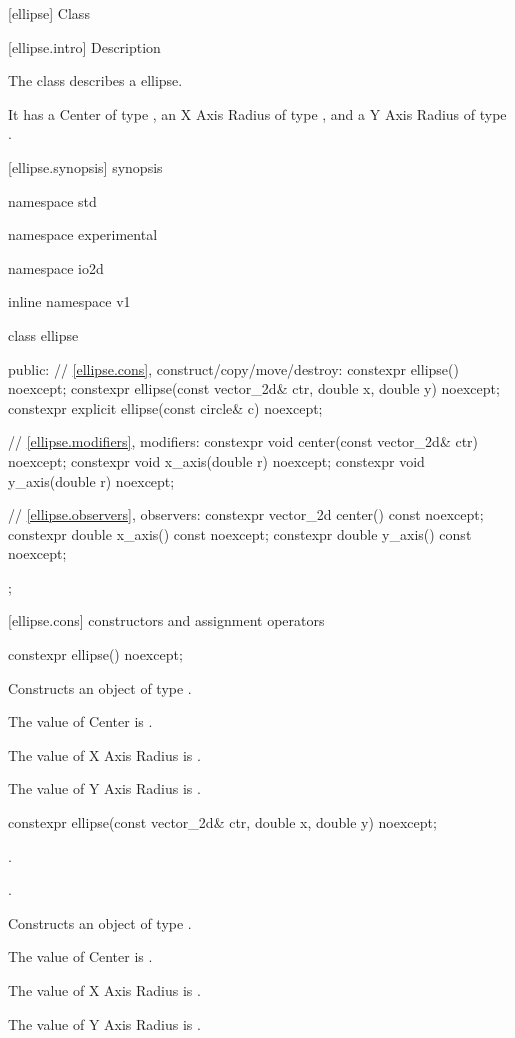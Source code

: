  [ellipse] {Class }

 [ellipse.intro] { Description}

\pnum
{}
The class  describes a ellipse.

\pnum
It has a Center of type , an X Axis Radius of type , and a Y Axis Radius of type .

 [ellipse.synopsis] { synopsis}

\begin{codeblock}
namespace std { namespace experimental { namespace io2d { inline namespace v1 {
  class ellipse {
  public:
    // \ref{ellipse.cons}, construct/copy/move/destroy:
    constexpr ellipse() noexcept;
    constexpr ellipse(const vector_2d& ctr, double x, double y) noexcept;
    constexpr explicit ellipse(const circle& c) noexcept;

    // \ref{ellipse.modifiers}, modifiers:
    constexpr void center(const vector_2d& ctr) noexcept;
    constexpr void x_axis(double r) noexcept;
    constexpr void y_axis(double r) noexcept;
    
    // \ref{ellipse.observers}, observers:
    constexpr vector_2d center() const noexcept;
    constexpr double x_axis() const noexcept;
    constexpr double y_axis() const noexcept;
  };
} } } }
\end{codeblock}

 [ellipse.cons] { constructors and assignment operators}

\begin{itemdecl}
constexpr ellipse() noexcept;
\end{itemdecl}
\begin{itemdescr}
\pnum
\effects
Constructs an object of type .

\pnum
The value of Center is .

\pnum
The value of X Axis Radius is .

\pnum
The value of Y Axis Radius is .
\end{itemdescr}

\begin{itemdecl}
constexpr ellipse(const vector_2d& ctr, double x, double y) noexcept;
\end{itemdecl}
\begin{itemdescr}
\pnum
\requires
{}.

\pnum
{}.

\pnum
\effects
Constructs an object of type .

\pnum
The value of Center is .

\pnum
The value of X Axis Radius is .

\pnum
The value of Y Axis Radius is .
\end{itemdescr}

